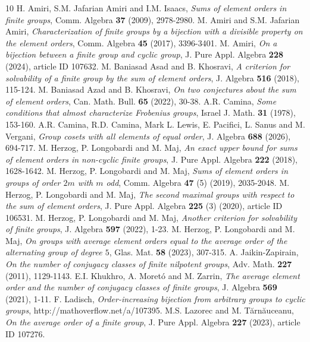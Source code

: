 \documentclass[12pt]{article}
\newcommand{\0}{{\leqno}}
\begin{document}
\begin{thebibliography}{10}
 H. Amiri, S.M. Jafarian Amiri and I.M. Isaacs, {\it Sums of element orders in finite groups}, Comm. Algebra {\bf 37} (2009), 2978-2980.
 M. Amiri and S.M. Jafarian Amiri, {\it Characterization of finite groups by a bijection with a divisible property on the element orders}, Comm. Algebra {\bf 45} (2017), 3396-3401.
 M. Amiri, {\it On a bijection between a finite group and cyclic group}, J. Pure Appl. Algebra {\bf 228} (2024), article ID 107632.
 M. Baniasad Asad and B. Khosravi, {\it A criterion for solvability of a finite group by the sum of element orders}, J. Algebra {\bf 516} (2018), 115-124.
 M. Baniasad Azad and B. Khosravi, {\it On two conjectures about the sum of element orders}, Can. Math. Bull. {\bf 65} (2022), 30-38.
 A.R. Camina, {\it Some conditions that almost characterize Frobenius groups}, Israel J. Math. {\bf 31} (1978), 153-160.
 A.R. Camina, R.D. Camina, Mark L. Lewis, E. Pacifici, L. Sanus and M. Vergani, {\it Group cosets with all elements of equal order}, J. Algebra {\bf 688} (2026), 694-717.
 M. Herzog, P. Longobardi and M. Maj, {\it An exact upper bound for sums of element orders in non-cyclic finite groups}, J. Pure Appl. Algebra {\bf 222} (2018), 1628-1642.
 M. Herzog, P. Longobardi and M. Maj, {\it Sums of element orders in groups of order $2m$ with $m$ odd}, Comm. Algebra {\bf 47} (5) (2019), 2035-2048.
 M. Herzog, P. Longobardi and M. Maj, {\it The second maximal groups with respect to the sum of element orders}, J. Pure Appl. Algebra {\bf 225} (3) (2020), article ID 106531.
 M. Herzog, P. Longobardi and M. Maj, {\it Another criterion for solvability of finite groups}, J. Algebra {\bf 597} (2022), 1-23.
 M. Herzog, P. Longobardi and M. Maj, {\it On groups with average element orders equal to the average order of the alternating group of degree $5$}, Glas. Mat. {\bf 58} (2023), 307-315.
 A. Jaikin-Zapirain, {\it On the number of conjugacy classes of finite nilpotent groups}, Adv. Math. {\bf 227} (2011), 1129-1143.
 E.I. Khukhro, A. Moret\' o and M. Zarrin, {\it The average element order and the number of conjugacy classes of finite groups}, J. Algebra {\bf 569} (2021), 1-11.
 F. Ladisch, {\it Order-increasing bijection from arbitrary groups to cyclic groups}, http://mathoverflow.net/a/107395.
 M.S. Lazorec and M. T\u arn\u auceanu, {\it On the average order of a finite group}, J. Pure Appl. Algebra {\bf 227} (2023), article ID 107276.

\end{thebibliography}
\end{document}
